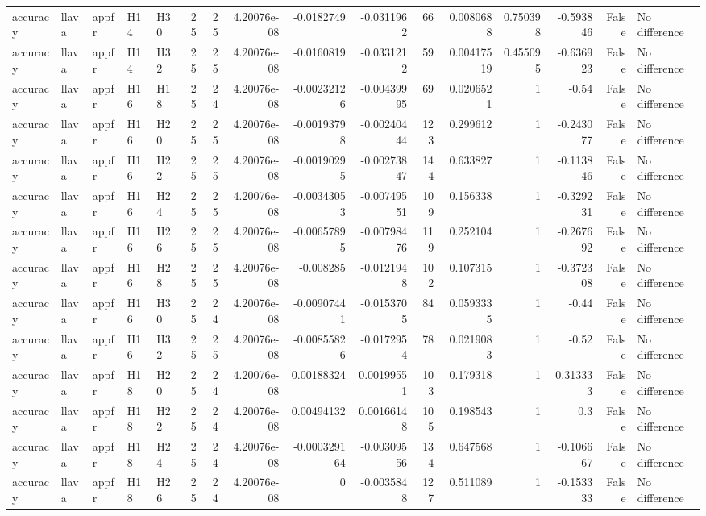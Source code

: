 \begin{longtable}{lllllrrrrrrrrrrl}
accuracy & llava & appfr & H14 & H30 & 25 & 25 & 4.20076e-08 & -0.0182749 & -0.0311962 & 66 & 0.0080688 & 0.750398 & -0.593846 & False & No difference \\
accuracy & llava & appfr & H14 & H32 & 25 & 25 & 4.20076e-08 & -0.0160819 & -0.0331212 & 59 & 0.00417519 & 0.455095 & -0.636923 & False & No difference \\
accuracy & llava & appfr & H16 & H18 & 25 & 24 & 4.20076e-08 & -0.00232126 & -0.00439995 & 69 & 0.0206521 & 1 & -0.54 & False & No difference \\
accuracy & llava & appfr & H16 & H20 & 25 & 25 & 4.20076e-08 & -0.00193798 & -0.00240444 & 123 & 0.299612 & 1 & -0.243077 & False & No difference \\
accuracy & llava & appfr & H16 & H22 & 25 & 25 & 4.20076e-08 & -0.00190295 & -0.00273847 & 144 & 0.633827 & 1 & -0.113846 & False & No difference \\
accuracy & llava & appfr & H16 & H24 & 25 & 25 & 4.20076e-08 & -0.00343053 & -0.00749551 & 109 & 0.156338 & 1 & -0.329231 & False & No difference \\
accuracy & llava & appfr & H16 & H26 & 25 & 25 & 4.20076e-08 & -0.00657895 & -0.00798476 & 119 & 0.252104 & 1 & -0.267692 & False & No difference \\
accuracy & llava & appfr & H16 & H28 & 25 & 25 & 4.20076e-08 & -0.008285 & -0.0121948 & 102 & 0.107315 & 1 & -0.372308 & False & No difference \\
accuracy & llava & appfr & H16 & H30 & 25 & 24 & 4.20076e-08 & -0.00907441 & -0.0153705 & 84 & 0.0593335 & 1 & -0.44 & False & No difference \\
accuracy & llava & appfr & H16 & H32 & 25 & 25 & 4.20076e-08 & -0.00855826 & -0.0172954 & 78 & 0.0219083 & 1 & -0.52 & False & No difference \\
accuracy & llava & appfr & H18 & H20 & 25 & 24 & 4.20076e-08 & 0.00188324 & 0.00199551 & 103 & 0.179318 & 1 & 0.313333 & False & No difference \\
accuracy & llava & appfr & H18 & H22 & 25 & 24 & 4.20076e-08 & 0.00494132 & 0.00166148 & 105 & 0.198543 & 1 & 0.3 & False & No difference \\
accuracy & llava & appfr & H18 & H24 & 25 & 24 & 4.20076e-08 & -0.000329164 & -0.00309556 & 134 & 0.647568 & 1 & -0.106667 & False & No difference \\
accuracy & llava & appfr & H18 & H26 & 25 & 24 & 4.20076e-08 & 0 & -0.0035848 & 127 & 0.511089 & 1 & -0.153333 & False & No difference \\

\end{longtable}
